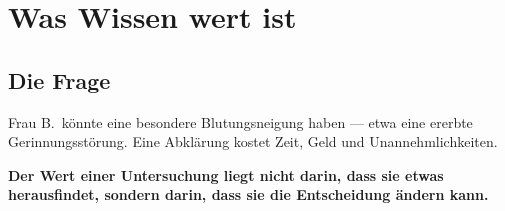 \chapter{Was Wissen wert ist}

\section{Die Frage}

\begin{merksatz}
Frau B.\ könnte eine besondere Blutungsneigung haben --- etwa eine ererbte Gerinnungsstörung. Eine Abklärung kostet Zeit, Geld und Unannehmlichkeiten.

\begin{center}
\begin{minipage}{0.9\textwidth}
\textbf{Der Wert einer Untersuchung liegt nicht darin, dass sie etwas herausfindet, sondern darin, dass sie die Entscheidung ändern kann.}
\end{minipage}
\end{center}

\begin{center}
\begin{minipage}{0.88\textwidth}
\end{minipage}
\end{center}
\end{merksatz}

